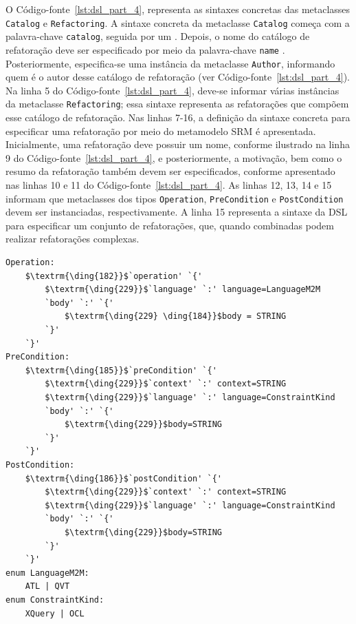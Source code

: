 O Código-fonte~\ref{lst:dsl_part_4}, representa as sintaxes concretas das metaclasses \texttt{Catalog} e \texttt{Refacto\-ring}. A sintaxe concreta da metaclasse \texttt{Catalog} começa com a palavra-chave \texttt{catalog}, seguida por um \aspas{\{}. Depois, o nome do catálogo de refatoração deve ser especificado por meio da palavra-chave \texttt{name} . Posteriormente, especifica-se uma instância da metaclasse \texttt{Author}, informando quem é o autor desse catálogo de refatoração (ver Código-fonte~\ref{lst:dsl_part_4}). Na linha 5 do Código-fonte~\ref{lst:dsl_part_4}, deve-se informar várias instâncias da metaclasse \texttt{Refactoring}; essa sintaxe representa as refatorações que compõem esse catálogo de refatoração. Nas linhas 7-16, a definição da sintaxe concreta para especificar uma refatoração por meio do metamodelo SRM é apresentada. Inicialmente, uma refatoração deve possuir um nome, conforme ilustrado na linha 9 do Código-fonte~\ref{lst:dsl_part_4}, e posteriormente, a motivação, bem como o resumo da refatoração também devem ser especificados, conforme apresentado nas linhas 10 e 11 do Código-fonte~\ref{lst:dsl_part_4}. As linhas 12, 13, 14 e 15 informam que metaclasses dos tipos \texttt{Operation}, \texttt{PreCondition} e \texttt{PostCondition} devem ser instanciadas, respectivamente. A linha 15 representa a sintaxe da DSL para especificar um conjunto de refatorações, que, quando combinadas podem realizar refatorações complexas.

\begin{lstlisting}[language=Xtext, frame=single, basicstyle=\scriptsize, mathescape=true, label={lst:dsl_part_5}, caption={Gramática da DSL - parte 5}]
Operation: 
	$\textrm{\ding{182}}$`operation' `{'
		$\textrm{\ding{229}}$`language' `:' language=LanguageM2M
		`body' `:' `{'
			$\textrm{\ding{229} \ding{184}}$body = STRING
		`}'
	`}'
PreCondition: 
	$\textrm{\ding{185}}$`preCondition' `{'
		$\textrm{\ding{229}}$`context' `:' context=STRING
		$\textrm{\ding{229}}$`language' `:' language=ConstraintKind
		`body' `:' `{' 
			$\textrm{\ding{229}}$body=STRING	
		`}'
	`}'
PostCondition: 
	$\textrm{\ding{186}}$`postCondition' `{'
		$\textrm{\ding{229}}$`context' `:' context=STRING
		$\textrm{\ding{229}}$`language' `:' language=ConstraintKind
		`body' `:' `{' 
			$\textrm{\ding{229}}$body=STRING	
		`}'
	`}'
enum LanguageM2M: 
	ATL | QVT
enum ConstraintKind: 
	XQuery | OCL

\end{lstlisting}

